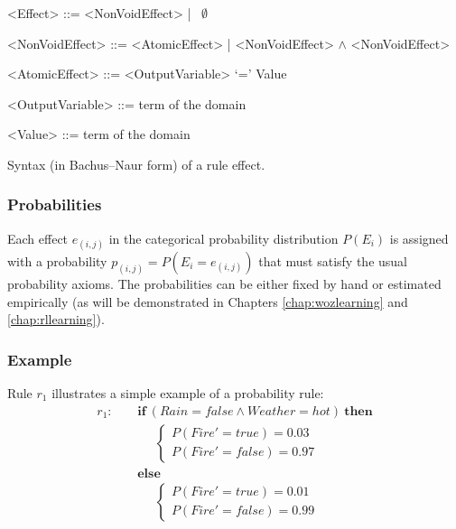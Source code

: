 \begin{table}[h]
\vspace{3mm}
\begin{grammar}

<Effect> ::= <NonVoidEffect> | \ $\emptyset$

<NonVoidEffect> ::= <AtomicEffect> | <NonVoidEffect> $\land$ <NonVoidEffect> 

<AtomicEffect> ::= <OutputVariable> `=' Value

<OutputVariable> ::= term of the domain

<Value> ::= term  of the domain

\end{grammar}
\caption{Syntax (in Bachus--Naur form) of a rule effect.}
\label{table:syntaxeffects}
\end{table}

\subsubsection*{Probabilities}

Each effect $e_{(i,j)}$ in the categorical probability distribution $P(E_i)$ is assigned with a probability $p_{(i,j)} = P(E_i = e_{(i,j)})$ that must satisfy the usual probability axioms.  The probabilities can be either fixed by hand or estimated empirically (as will be demonstrated in Chapters \ref{chap:wozlearning} and \ref{chap:rllearning}).


\subsubsection*{Example}

Rule $r_1$ illustrates a simple example of a probability rule:
\begin{align*}
r_1: \ \ \ \ \ & \textbf{if} \ (\mathit{Rain}\!=\!\mathit{false} \land \mathit{Weather}\!=\!\mathit{hot}) \ \textbf{then} \\
& \;\;\;\;\;  \begin{cases}
 P(\mathit{Fire}'\!=\!\mathit{true}) = 0.03 \\ 
P(\mathit{Fire}'\!=\!\mathit{false}) = 0.97
\end{cases} \\ 
& \textbf{else} \\
& \;\;\;\;\; \begin{cases}
P(\mathit{Fire}'\!=\!\mathit{true}) = 0.01 \\
P(\mathit{Fire}'\!=\!\mathit{false}) = 0.99
\end{cases} 
\end{align*}


